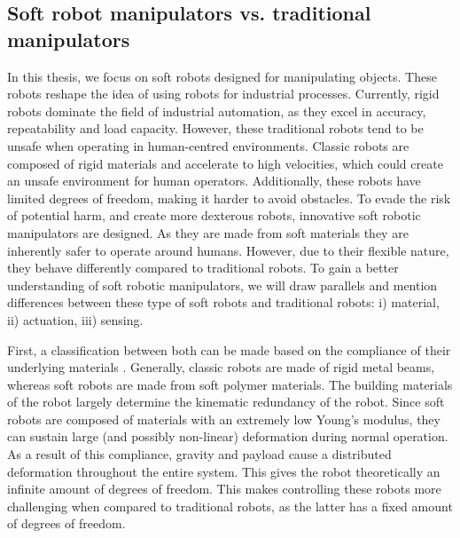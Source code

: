 \subsection*{Soft robot manipulators vs. traditional manipulators }

In this thesis, we focus on soft robots designed for manipulating objects. These robots reshape the idea of using robots for industrial processes. Currently, rigid robots dominate the field of industrial automation, as they excel in accuracy, repeatability and load capacity. However, these traditional robots tend to be unsafe when operating in human-centred environments. Classic robots are composed of rigid materials and accelerate to high velocities, which could create an unsafe environment for human operators. Additionally, these robots have limited degrees of freedom, making it harder to avoid obstacles. To evade the risk of potential harm, and create more dexterous robots, innovative soft robotic manipulators are designed. As they are made from soft materials they are inherently safer to operate around humans. However, due to their flexible nature, they behave differently compared to traditional robots. To gain a better understanding of soft robotic manipulators, we will draw parallels and mention differences between these type of soft robots and traditional robots: i) material, ii) actuation, iii) sensing.


First, a classification between both can be made based on the compliance of their underlying materials \cite{Bionics2008}. Generally, classic robots are made of rigid metal beams, whereas soft robots are made from soft polymer materials. The building materials of the robot largely determine the kinematic redundancy of the robot. Since soft robots are composed of materials with an extremely low Young's modulus, they can sustain large (and possibly non-linear) deformation during normal operation. As a result of this compliance, gravity and payload cause a distributed deformation throughout the entire system. This gives the robot theoretically an infinite amount of degrees of freedom. This makes controlling these robots more challenging when compared to traditional robots, as the latter has a fixed amount of degrees of freedom.


